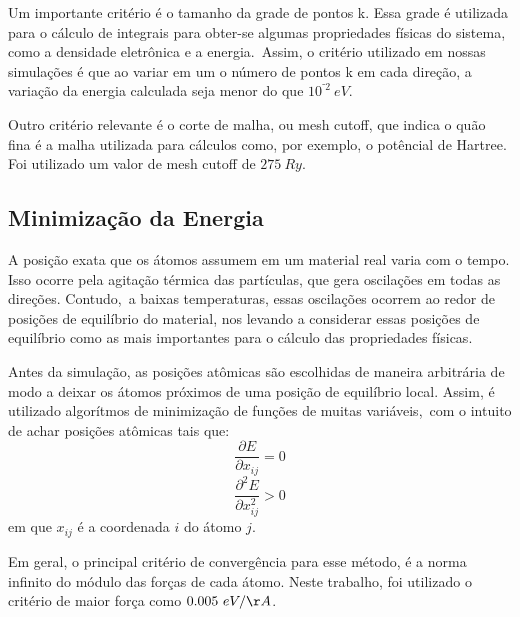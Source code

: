 Um importante critério é o tamanho da grade de pontos k. Essa grade é utilizada para o cálculo de integrais para obter-se algumas propriedades físicas do sistema, como a densidade eletrônica e a energia.\
Assim, o critério utilizado em nossas simulações é que ao variar em um o número de pontos k em cada direção, a variação da energia calculada seja menor do que $10^{⁻2}~eV$.

Outro critério relevante é o corte de malha, ou mesh cutoff, que indica o quão fina é a malha utilizada para cálculos como, por exemplo, o potêncial de Hartree. Foi utilizado um valor de mesh cutoff de $275~Ry$.

\subsection{Minimização da Energia}

A posição exata que os átomos assumem em um material real varia com o tempo. Isso ocorre pela agitação térmica das partículas, que gera oscilações em todas as direções. Contudo,\
a baixas temperaturas, essas oscilações ocorrem ao redor de posições de equilíbrio do material, nos levando a considerar essas posições de equilíbrio como as mais importantes para o cálculo das propriedades físicas.

Antes da simulação, as posições atômicas são escolhidas de maneira arbitrária de modo a deixar os átomos próximos de uma posição de equilíbrio local. Assim, é utilizado algorítmos de minimização de funções de muitas variáveis,\
com o intuito de achar posições atômicas tais que:
\begin{equation}
  \frac{\partial E}{\partial  x_{ij}} = 0
\end{equation}
\begin{equation}
  \frac{\partial^2 E}{\partial x_{ij}^2} > 0
\end{equation}
em que $ x_{ij}$ é a coordenada $i$ do átomo $j$.

Em geral, o principal critério de convergência para esse método, é a norma infinito do módulo das forças de cada átomo. Neste trabalho, foi utilizado o critério de maior força como $0.005~eV/\AA$.
